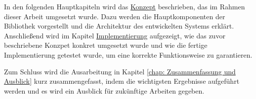 In den folgenden Hauptkapiteln wird das \hyperref[chap: Konzept]{Konzept} beschrieben, das im Rahmen dieser Arbeit umgesetzt wurde. Dazu werden die Hauptkomponenten der Bibliothek vorgestellt und die Architektur des entwickelten Systems erklärt. Anschließend wird im Kapitel \hyperref[chap: Implementierung und Test]{Implementierung} aufgezeigt, wie das zuvor beschriebene Konzpet konkret umgesetzt wurde und wie die fertige Implementierung getestet wurde, um eine korrekte Funktionsweise zu garantieren.


Zum Schluss wird die Ausarbeitung in Kapitel \ref{chap: Zusammenfassung und Ausblick} kurz zusammengefasst, indem die wichtigsten Ergebnisse aufgeführt werden und es wird ein Ausblick für zukünftige Arbeiten gegeben.  